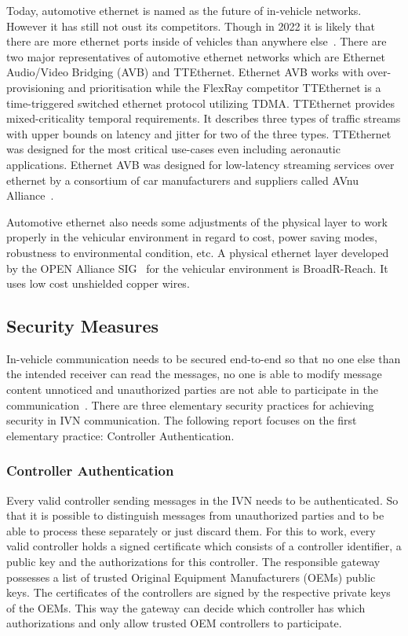 Today, automotive ethernet is named as the future of in-vehicle networks.
However it has still not oust its competitors. Though in 2022 it is likely that
there are more ethernet ports inside of vehicles than anywhere
else~\cite{Ixia2014}. There are two major representatives of automotive ethernet
networks which are Ethernet Audio/Video Bridging (AVB) and TTEthernet. Ethernet
AVB works with over-provisioning and prioritisation while the FlexRay competitor
TTEthernet is a time-triggered switched ethernet protocol utilizing TDMA\@.
TTEthernet provides mixed-criticality temporal requirements. It describes three
types of traffic streams with upper bounds on latency and jitter for two of the
three types. TTEthernet was designed for the most critical use-cases even
including aeronautic applications. Ethernet AVB was designed for low-latency
streaming services over ethernet by a consortium of car manufacturers and
suppliers called AVnu Alliance~\cite{AVNU2018}.

Automotive ethernet also needs some adjustments of the physical layer to work
properly in the vehicular environment in regard to cost, power saving modes,
robustness to environmental condition, etc. A physical ethernet layer developed
by the OPEN Alliance SIG~\cite{SIG2018} for the vehicular environment is
BroadR-Reach. It uses low cost unshielded copper wires. 

\subsection{Security Measures}

In-vehicle communication needs to be secured end-to-end so that no one else than
the intended receiver can read the messages, no one is able to modify message
content unnoticed and unauthorized parties are not able to participate in the
communication~\cite{Lemke2006}. There are three elementary security practices
for achieving security in IVN communication. The following report focuses on the
first elementary practice: Controller Authentication.

\subsubsection{Controller Authentication}

Every valid controller sending messages in the IVN needs to be authenticated. So
that it is possible to distinguish messages from unauthorized parties and to be
able to process these separately or just discard them. For this to work, every
valid controller holds a signed certificate which consists of a controller
identifier, a public key and the authorizations for this controller. The
responsible gateway possesses a list of trusted Original Equipment Manufacturers
(OEMs) public keys. The certificates of the controllers are signed by the
respective private keys of the OEMs. This way the gateway can decide which
controller has which authorizations and only allow trusted OEM controllers to
participate.

